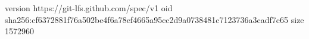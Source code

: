 version https://git-lfs.github.com/spec/v1
oid sha256:cf6372881f76a502be4f6a78ef4665a95cc2d9a0738481c7123736a3cadf7c65
size 1572960
